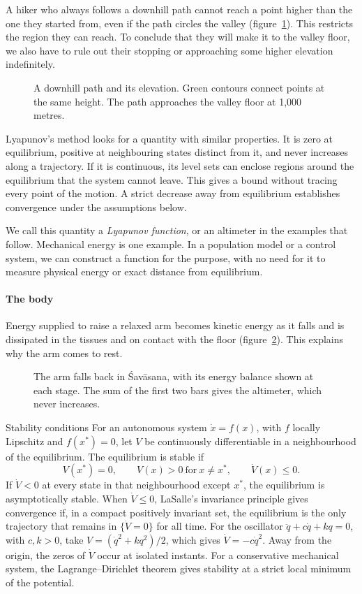 A hiker who always follows a downhill path cannot reach a point higher than the one they started from, even if the path circles the valley (figure~\ref{fig:escursionista}). This restricts the region they can reach. To conclude that they will make it to the valley floor, we also have to rule out their stopping or approaching some higher elevation indefinitely.

\begin{figure}
\caption{A downhill path and its elevation. Green contours connect points at the same height. The path approaches the valley floor at 1,000 metres.}
\label{fig:escursionista}
\end{figure}

Lyapunov's method looks for a quantity with similar properties. It is zero at equilibrium, positive at neighbouring states distinct from it, and never increases along a trajectory. If it is continuous, its level sets can enclose regions around the equilibrium that the system cannot leave. This gives a bound without tracing every point of the motion. A strict decrease away from equilibrium establishes convergence under the assumptions below.

We call this quantity a \emph{Lyapunov function}, or an altimeter in the examples that follow. Mechanical energy is one example. In a population model or a control system, we can construct a function for the purpose, with no need for it to measure physical energy or exact distance from equilibrium.

\paragraph{The body} Energy supplied to raise a relaxed arm becomes kinetic energy as it falls and is dissipated in the tissues and on contact with the floor (figure~\ref{fig:braccio}). This explains why the arm comes to rest.

\begin{figure}
\caption{The arm falls back in Śavāsana, with its energy balance shown at each stage. The sum of the first two bars gives the altimeter, which never increases.}
\label{fig:braccio}
\end{figure}

\begin{formule}{Stability conditions}
For an autonomous system $\dot x=f(x)$, with $f$ locally Lipschitz and $f(x^\ast)=0$, let $V$ be continuously differentiable in a neighbourhood of the equilibrium. The equilibrium is stable if
\[
V(x^\ast)=0, \qquad V(x)>0 \ \text{for}\ x\neq x^\ast, \qquad \dot V(x)\le 0.
\]
If $\dot V<0$ at every state in that neighbourhood except $x^\ast$, the equilibrium is asymptotically stable. When $\dot V\le0$, LaSalle's invariance principle gives convergence if, in a compact positively invariant set, the equilibrium is the only trajectory that remains in $\{\dot V=0\}$ for all time. For the oscillator $\ddot q+c\dot q+kq=0$, with $c,k>0$, take $V=(\dot q^2+kq^2)/2$, which gives $\dot V=-c\dot q^2$. Away from the origin, the zeros of $\dot V$ occur at isolated instants. For a conservative mechanical system, the Lagrange--Dirichlet theorem gives stability at a strict local minimum of the potential.
\end{formule}

